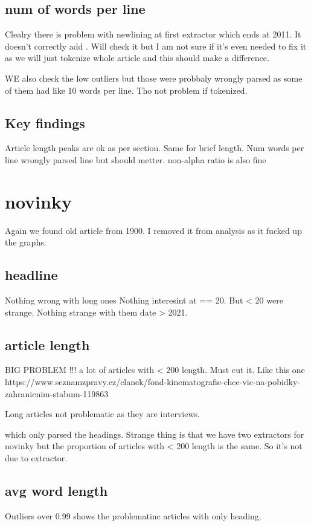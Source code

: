 \documentclass{article}
\begin{document}
    \subsection{num of words per line}
    Clealry there is problem with newlining at first extractor which ends at 2011. It doesn't correctly add \n. Will check it but I am not sure if it's even needed to fix it as we will just tokenize whole article and this should make a difference.

    WE also check the low outliers but those were probbaly wrongly parsed as some of them had like 10 words per line. Tho not problem if tokenized.

    \subsection{Key findings}
    Article length peaks are ok as per section. Same for brief length.
    Num words per line wrongly parsed line but should metter. non-alpha ratio is also fine

    \section{novinky}
    Again we found old article from 1900. I removed it from analysis as it fucked up the graphs.
    \subsection{headline}
        Nothing wrong with long ones
        Nothing interesint at == 20. But < 20 were strange.
        Nothing strange with them date > 2021.

    \subsection{article length}
        BIG PROBLEM !!! a lot of articles with < 200 length. Must cut it.
        Like this one https://www.seznamzpravy.cz/clanek/fond-kinematografie-chce-vic-na-pobidky-zahranicnim-stabum-119863

        Long articles not problematic as they are interviews.

        which only parsed the headings.
        Strange thing is that we have two extractors for novinky but the proportion of articles with < 200 length is the same. So it's not due to extractor.

    \subsection{avg word length}
        Outliers over 0.99 shows the problematinc articles with only heading.
\end{document}

